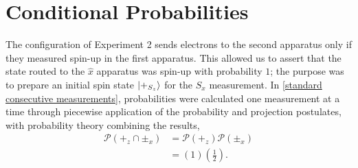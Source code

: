 
\section{Conditional Probabilities}
The configuration of Experiment 2 sends electrons to the second apparatus only if they measured spin-up in the first apparatus. This allowed us to assert that the state routed to the $\hat{x}$ apparatus was spin-up with probability $1$; the purpose was to prepare an initial spin state $\ket{+_{S_z}}$ for the $S_x$ measurement. In \autoref{standard consecutive measurements}, probabilities were calculated one measurement at a time through piecewise application of the probability and projection postulates, with probability theory combining the results,
\begin{align}
  \mathcal{P}(+_z \cap \pm_x) &= \mathcal{P}(+_z)\mathcal{P}(\pm_x) \\ \nonumber
  &= (1)\left(\frac{1}{2}\right).
\end{align}

